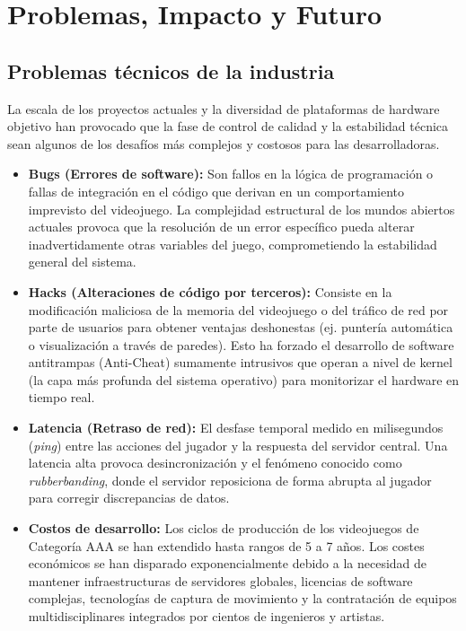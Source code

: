 \documentclass[12pt]{report}
\begin{document}
\chapter{Problemas, Impacto y Futuro}

\section{Problemas técnicos de la industria}

La escala de los proyectos actuales y la diversidad de plataformas de hardware objetivo han provocado que la fase de control de calidad y la estabilidad técnica sean algunos de los desafíos más complejos y costosos para las desarrolladoras.

\begin{itemize}
    \item \textbf{Bugs (Errores de software):} Son fallos en la lógica de programación o fallas de integración en el código que derivan en un comportamiento imprevisto del videojuego. La complejidad estructural de los mundos abiertos actuales provoca que la resolución de un error específico pueda alterar inadvertidamente otras variables del juego, comprometiendo la estabilidad general del sistema.
    \item \textbf{Hacks (Alteraciones de código por terceros):} Consiste en la modificación maliciosa de la memoria del videojuego o del tráfico de red por parte de usuarios para obtener ventajas deshonestas (ej. puntería automática o visualización a través de paredes). Esto ha forzado el desarrollo de software antitrampas (Anti-Cheat) sumamente intrusivos que operan a nivel de kernel (la capa más profunda del sistema operativo) para monitorizar el hardware en tiempo real.
    \item \textbf{Latencia (Retraso de red):} El desfase temporal medido en milisegundos (\textit{ping}) entre las acciones del jugador y la respuesta del servidor central. Una latencia alta provoca desincronización y el fenómeno conocido como \textit{rubberbanding}, donde el servidor reposiciona de forma abrupta al jugador para corregir discrepancias de datos.
    \item \textbf{Costos de desarrollo:} Los ciclos de producción de los videojuegos de Categoría AAA se han extendido hasta rangos de 5 a 7 años. Los costes económicos se han disparado exponencialmente debido a la necesidad de mantener infraestructuras de servidores globales, licencias de software complejas, tecnologías de captura de movimiento y la contratación de equipos multidisciplinares integrados por cientos de ingenieros y artistas.
\end{itemize}
\end{document}
